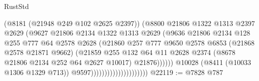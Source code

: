 \begin{lexlean}{RustStd}
\begin{coremodule}
                                                (@8181 (@21948 @249 @102 @2625 @2397))
                                                (@8800
                                                  @21806
                                                  @1322
                                                  @1313
                                                  @2397
                                                  @2629
                                                  (@9627
                                                    @21806
                                                    @2134
                                                    @1322
                                                    @1313
                                                    @2629
                                                    (@9636
                                                      @21806
                                                      @2134
                                                      @128
                                                      @255
                                                      @777
                                                      @64
                                                      @2578
                                                      @2628
                                                      (@21860
                                                        @257
                                                        @777
                                                        @9650
                                                        @2578
                                                        @6853
                                                        (@21868 @2578 @21871 @9662)
                                                        (@21859
                                                          @255
                                                          @132
                                                          @64
                                                          @11
                                                          @2628
                                                          @2374
                                                          (@8678 @21806 @2134 @252 @64 @2627 @10017)
                                                          @21876))))))
                                              @10028
                                              (@8411 (@10033 @1306 @1329 @713))
                                              @9597)))))))))))))))))))))
@22119 := @7828 @787

\end{coremodule}
\end{lexlean}
